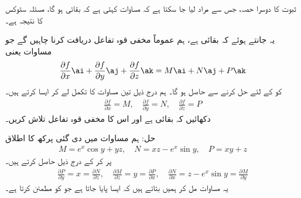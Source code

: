 ثبوت کا دوسرا حصہ، جس سے مراد لیا جا سکتا ہے کہ مساوات  کہتی ہے کہ  بقائی ہو گا، مسئلہ سٹوکس کا نتیجہ ہے۔

یہ جانتے ہوئے کہ  بقائی ہے، ہم عموماً مخفی قوہ تفاعل  دریافت کرنا چاہیں گے جو مساوات  یعنی
\begin{align*}
\frac{\partial f}{\partial x}\ai+\frac{\partial f}{\partial y}\aj+\frac{\partial f}{\partial z}\ak=M\ai+N\aj+P\ak
\end{align*}
کو  کے لئے حل کرنے سے حاصل ہو گا۔ ہم درج ذیل تین مساوات کا تکمل لے کر ایسا کرتے ہیں۔
\begin{align*}
\frac{\partial f}{\partial x}=M,\quad \frac{\partial f}{\partial y}=N,\quad \frac{\partial f}{\partial z}=P
\end{align*}
%
دکھائیں کہ  بقائی ہے اور اس کا مخفی قوہ تفاعل  تلاش کریں۔

حل:\quad
ہم مساوات  میں دی گئی پرکھ کا اطلاق 
\begin{align*}
M=e^x\cos y+yz,\quad N=xz-e^x\sin y,\quad P=xy+z
\end{align*}
پر کر کے درج ذیل حاصل کرتے ہیں۔
\begin{align*}
\frac{\partial P}{\partial y}=x=\frac{\partial N}{\partial z},\quad \frac{\partial M}{\partial z}=y=\frac{\partial P}{\partial x},\quad \frac{\partial N}{\partial x}=z-e^x\sin y=\frac{\partial M}{\partial y}
\end{align*}
یہ مساوات مل کر ہمیں بتاتے ہیں کہ  ایسا  پایا جاتا ہے جو  کو مطمئن کرتا ہے۔

